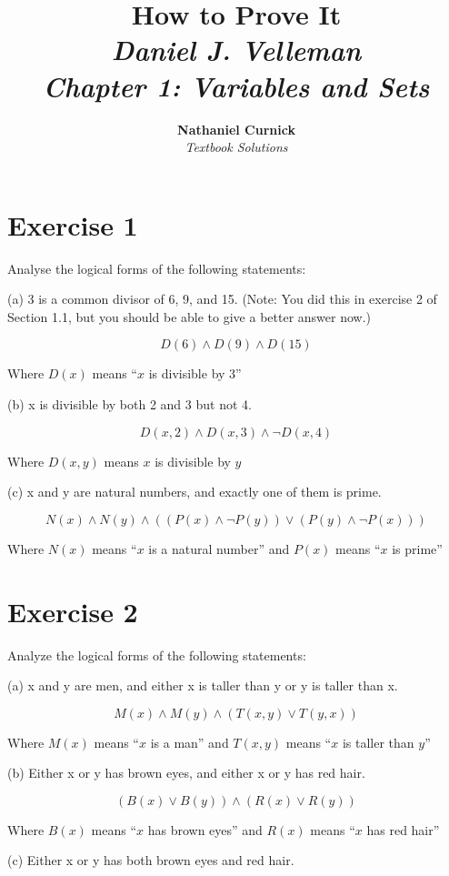 \documentclass[11pt]{article}
\title{\textbf{How to Prove It} \\ {\Large\itshape Daniel J. Velleman} \\ {\Large\itshape Chapter 1: Variables and Sets}}
\author{\textbf{Nathaniel Curnick} \\ \textit{Textbook Solutions}}
\date{}
\begin{document}
\maketitle

\section*{Exercise 1}

Analyse the logical forms of the following statements:

\noindent (a) 3 is a common divisor of 6, 9, and 15. (Note: You did this in exercise 2 of Section 1.1, but you should be able to give a better answer now.)

$$D(6) \wedge D(9) \wedge D(15)$$

Where $D(x)$ means ``$x$ is divisible by 3''

\noindent (b) x is divisible by both 2 and 3 but not 4.

$$D(x, 2) \wedge D(x, 3) \wedge \neg D(x, 4)$$

Where $D(x,y)$ means $x$ is divisible by $y$

\noindent (c) x and y are natural numbers, and exactly one of them is prime.

$$N(x) \wedge N(y) \wedge ((P(x) \wedge \neg P(y)) \vee (P(y) \wedge \neg P(x)))$$

Where $N(x)$ means ``$x$ is a natural number'' and $P(x)$ means ``$x$ is prime''

\section*{Exercise 2}

Analyze the logical forms of the following statements:

\noindent  (a) x and y are men, and either x is taller than y or y is taller than x.

$$M(x) \wedge M(y) \wedge (T(x,y) \vee T(y,x))$$

Where $M(x)$ means ``$x$ is a man'' and $T(x,y)$ means ``$x$ is taller than $y$''

\noindent (b) Either x or y has brown eyes, and either x or y has red hair.

$$(B(x) \vee B(y)) \wedge (R(x) \vee R(y))$$

Where $B(x)$ means ``$x$ has brown eyes'' and $R(x)$ means ``$x$ has red hair''

\noindent (c) Either x or y has both brown eyes and red hair.
\end{document}
